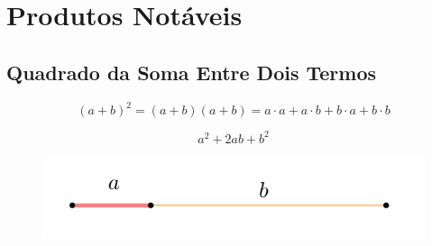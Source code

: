\begin{enumerate}
\item $\sqrt[n]{a \cdot b} = \sqrt[n]{a} \cdot \sqrt[n]{b} $

\item $\sqrt[n]{\dfrac{a}{b}} = \dfrac{\sqrt[n]{a}}{\sqrt[n]{b}}} ,\,\,\, b > 0$

\item $(\sqrt[n]{a})^m = \sqrt[n]{a^m}$

\item $\sqrt[n]{a^m} = \sqrt[n\cdot p]{a^{m\cdot p}}$

\item $\sqrt[p]{\sqrt[n]{a^m}} = \sqrt[p \cdot n]{a^m}$
\end{enumerate}

\newpage
\section{Produtos Notáveis}

\subsection{Quadrado da Soma Entre Dois Termos}

	
	$$(a+b)^{2} = (a+b)(a+b) = a\cdot a + a\cdot b + b\cdot a + b\cdot b $$
	
	
	$$a^2+2ab+b^2$$
	
\begin{figure}[H]
	\centering
	
	\includegraphics[scale=3.5]{imagens/soma-quadrado1.png}

\end{figure}

